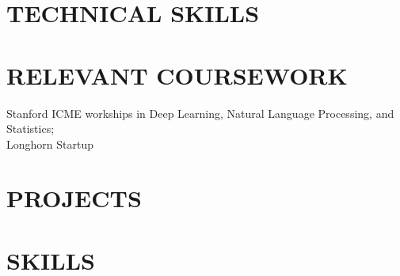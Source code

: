 \documentclass{res}
\begin{document}
\begin{resume}
\begin{itemize}
	\end{itemize}

\section{TECHNICAL SKILLS}
\section{RELEVANT COURSEWORK}
	Stanford ICME workships in Deep Learning, Natural Language Processing, and Statistics; \\ Longhorn Startup
\section{PROJECTS}
\section{SKILLS}

\end{resume}
\end{document}
